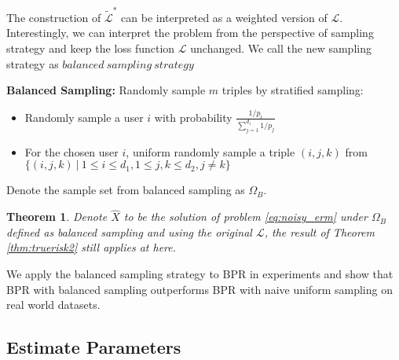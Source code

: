 \documentclass{article}
\numberwithin{equation}{section}
\newtheorem{theorem}{Theorem}
\newtheorem{sampling strategy}{Sampling Strategy}
\begin{document}
The construction of $\tilde{\mathcal{L}}^*$ can be interpreted as a weighted version of $\mathcal{L}$. Interestingly, we can interpret the problem from the perspective of sampling strategy and keep the loss function $\mathcal{L}$ unchanged. We call the new sampling strategy as $balanced~sampling~strategy$

\textbf{Balanced Sampling:} Randomly sample $m$ triples by stratified sampling:
\begin{itemize}
    \item Randomly sample a user $i$ with probability $\frac{1/p_i}{\sum_{j=1}^{d_1} 1/p_j}$
    \item For the chosen user $i$, uniform randomly sample a triple $(i,j,k)$ from $\{(i,j,k)~|~ 1\leq i \leq d_1, 1\leq j,k\leq d_2, j\neq k\}$
\end{itemize}
Denote the sample set from balanced sampling as $\Omega_B$.

\begin{theorem}
 Denote $\hat{X}$ to be the solution of problem \ref{eq:noisy_erm} under $\Omega_B$ defined as balanced sampling and using the original $\mathcal{L}$, the result of Theorem \ref{thm:truerisk2} still applies at here. %
\label{thm:bsample}
\end{theorem}

We apply the balanced sampling strategy to BPR in experiments and show that BPR with balanced sampling outperforms BPR with naive uniform sampling on real world datasets.

\subsection{Estimate Parameters}
\label{sec:estimate}
\end{document}
